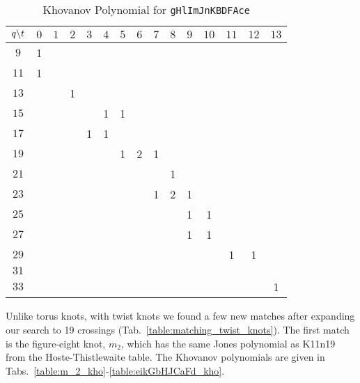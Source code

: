 \documentclass{article}
\theoremstyle{plain}
\begin{document}
        \begin{table}[H]
            \centering
            \begin{tabular}{| c | c | c | c | c | c | c | c | c | c | c | c | c | c | c |}
                \hline
                $q\symbol{92}t$&$0$&$1$&$2$&$3$&$4$&$5$&$6$&$7$&$8$&$9$&$10$&$11$&$12$&$13$\\
                \hline
                $9$&1&&&&&&&&&&&&&\\
                \hline
                $11$&1&&&&&&&&&&&&&\\
                \hline
                $13$&&&1&&&&&&&&&&&\\
                \hline
                $15$&&&&&1&1&&&&&&&&\\
                \hline
                $17$&&&&1&1&&&&&&&&&\\
                \hline
                $19$&&&&&&1&2&1&&&&&&\\
                \hline
                $21$&&&&&&&&&1&&&&&\\
                \hline
                $23$&&&&&&&&1&2&1&&&&\\
                \hline
                $25$&&&&&&&&&&1&1&&&\\
                \hline
                $27$&&&&&&&&&&1&1&&&\\
                \hline
                $29$&&&&&&&&&&&&1&1&\\
                \hline
                $31$&&&&&&&&&&&&&&\\
                \hline
                $33$&&&&&&&&&&&&&&1\\
                \hline
            \end{tabular}
            \caption{Khovanov Polynomial for \texttt{gHlImJnKBDFAce}}
            \label{table:t_gHlImJnKBDFAce_kho}
        \end{table}
        \par\hfill\par
        Unlike torus knots, with twist knots we found a few new matches after
        expanding our search to 19 crossings
        (Tab.~\ref{table:matching_twist_knots}). The first match is the
        figure-eight knot, $m_{2}$, which has the same Jones polynomial as
        K11n19 from the Hoste-Thistlewaite table. The Khovanov polynomials are
        given in Tabs.~\ref{table:m_2_kho}-\ref{table:eikGbHJCaFd_kho}.
\end{document}
